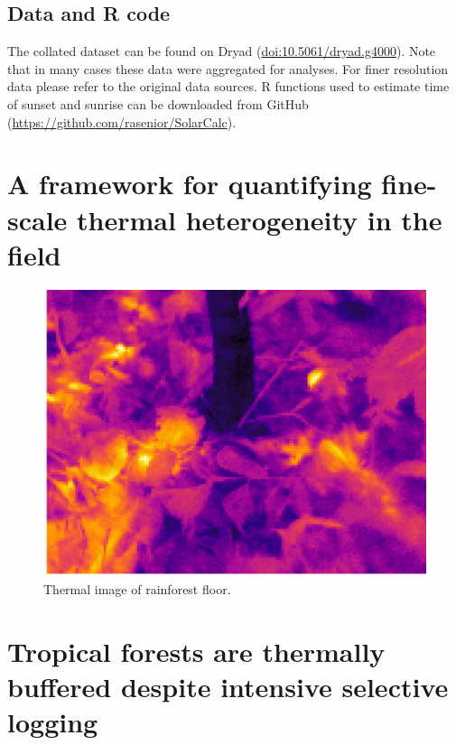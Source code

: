 \documentclass[12pt,a4paper,]{report}
\theoremstyle{definition}
\theoremstyle{definition}
\theoremstyle{definition}
\theoremstyle{remark}
\begin{document}
\section{Data and R code}\label{data-and-r-code}

The collated dataset can be found on Dryad
(\url{doi:10.5061/dryad.g4000}). Note that in many cases these data were
aggregated for analyses. For finer resolution data please refer to the
original data sources. R functions used to estimate time of sunset and
sunrise can be downloaded from GitHub
(\url{https://github.com/rasenior/SolarCalc}).

\chapter{A framework for quantifying fine-scale thermal heterogeneity in
the
field}\label{a-framework-for-quantifying-fine-scale-thermal-heterogeneity-in-the-field}

\begin{figure}[!htb]
\centering
\includegraphics[width=15cm]{pics/Themal-image1.png}
\caption*{Thermal image of rainforest floor.}
\end{figure}

\pagebreak

\chapter{Tropical forests are thermally buffered despite intensive
selective
logging}\label{tropical-forests-are-thermally-buffered-despite-intensive-selective-logging}
\end{document}

